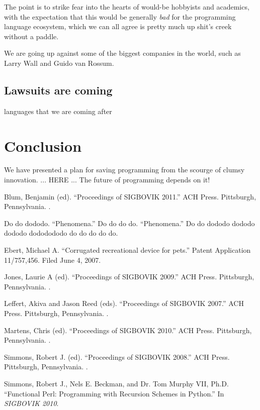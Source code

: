 \documentclass[acmtocl]%
{boviktrans}
\begin{document}
The point is to strike fear into the hearts of would-be hobbyists and
academics, with the expectation that this would be generally {\it bad}
for the programming language ecosystem, which we can all agree is
pretty much up shit's creek without a paddle.

We are going up against some of the biggest companies in the world,
such as Larry Wall and Guido van Rossum.


\subsection{Lawsuits are coming}

languages that we are coming after


\section{Conclusion}

We have presented a plan for saving programming from the scourge of clumsy innovation. 
... HERE ...
The future of programming depends on it!

\begin{thebibliography}{1}

Blum, Benjamin (ed).
\newblock ``Proceedings of SIGBOVIK 2011.''
\newblock ACH Press.
\newblock Pittsburgh, Pennsylvania.
.

Do do dododo. 
\newblock ``Phenomena.''
\newblock Do do do do. 
\newblock ``Phenomena.'' 
\newblock Do do dododo dododo dododo dododododo do do do do do.

Ebert, Michael A.
\newblock ``Corrugated recreational device for pets.''
\newblock Patent Application 11/757,456.
\newblock Filed June 4, 2007.

Jones, Laurie A (ed).
\newblock ``Proceedings of SIGBOVIK 2009.''
\newblock ACH Press.
\newblock Pittsburgh, Pennsylvania.
.

Leffert, Akiva and Jason Reed (eds).
\newblock ``Proceedings of SIGBOVIK 2007.''
\newblock ACH Press.
\newblock Pittsburgh, Pennsylvania.
.

Martens, Chris (ed).
\newblock ``Proceedings of SIGBOVIK 2010.''
\newblock ACH Press.
\newblock Pittsburgh, Pennsylvania.
.

Simmons, Robert J. (ed).
\newblock ``Proceedings of SIGBOVIK 2008.''
\newblock ACH Press.
\newblock Pittsburgh, Pennsylvania.
.

Simmons, Robert J., Nels E. Beckman, and Dr. Tom Murphy VII, Ph.D.
\newblock ``Functional Perl: Programming with Recursion Schemes in Python.''
\newblock In {\it SIGBOVIK 2010}.

\end{thebibliography}
\end{document}
